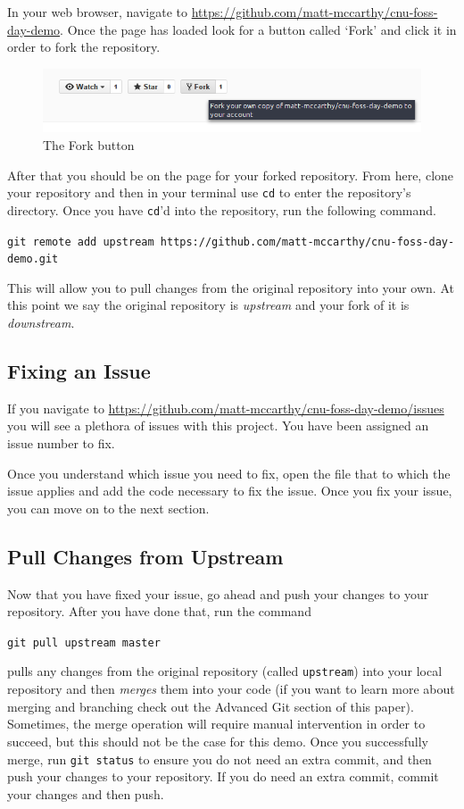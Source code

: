 \documentclass[notitlepage]{simple}
\begin{document}
In your web browser, navigate to \url{https://github.com/matt-mccarthy/cnu-foss-day-demo}.
Once the page has loaded look for a button called `Fork' and click it in order to fork the repository.
\begin{figure}[H]
	\centering
	\includegraphics[scale=0.5]{fork-repo.png}
	\caption{The Fork button}
\end{figure}
After that you should be on the page for your forked repository.
From here, clone your repository and then in your terminal use \verb|cd| to enter the repository's directory.
Once you have \verb|cd|'d into the repository, run the following command.
\begin{terminal}
	\verb|git remote add upstream https://github.com/matt-mccarthy/cnu-foss-day-demo.git|
\end{terminal}
This will allow you to pull changes from the original repository into your own.
At this point we say the original repository is \textit{upstream} and your fork of it is \textit{downstream}.

\subsection{Fixing an Issue}

If you navigate to \url{https://github.com/matt-mccarthy/cnu-foss-day-demo/issues} you will see a plethora of issues with this project.
You have been assigned an issue number to fix.

Once you understand which issue you need to fix, open the file that to which the issue applies and add the code necessary to fix the issue.
Once you fix your issue, you can move on to the next section.

\subsection{Pull Changes from Upstream}

Now that you have fixed your issue, go ahead and push your changes to your repository.
After you have done that, run the command
\begin{terminal}
	\verb|git pull upstream master|
\end{terminal}
pulls any changes from the original repository (called \verb|upstream|) into your local repository and then \textit{merges} them into your code
(if you want to learn more about merging and branching check out the Advanced Git section of this paper).
Sometimes, the merge operation will require manual intervention in order to succeed, but this should not be the case for this demo.
Once you successfully merge, run \verb|git status| to ensure you do not need an extra commit, and then push your changes to your repository.
If you do need an extra commit, commit your changes and then push.
\end{document}

